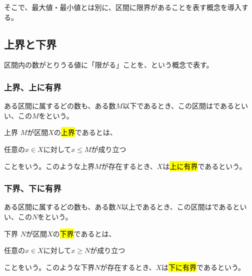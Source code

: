 \documentclass[../imaging-math]{subfiles}
\begin{document}
そこで、最大値・最小値とは別に、区間に限界があることを表す概念を導入する。

\subsection{上界と下界}

区間内の数がとりうる値に「限がる」ことを、という概念で表す。

\subsubsection{上界、上に有界}

ある区間に属するどの数も、ある数$M$以下であるとき、この区間はであるといい、この$M$をという。

\begin{definition}{上界}
  $M$が区間$X$の\hl{上界}であるとは、
  \begin{center}
    任意の$x \in X$に対して$x \leq M$が成り立つ
  \end{center}
  ことをいう。このような上界$M$が存在するとき、$X$は\hl{上に有界}であるという。
\end{definition}

\begin{center}
\end{center}

\subsubsection{下界、下に有界}

ある区間に属するどの数も、ある数$N$以上であるとき、この区間はであるといい、この$N$をという。

\begin{definition}{下界}
  $N$が区間$X$の\hl{下界}であるとは、
  \begin{center}
    任意の$x \in X$に対して$x \geq N$が成り立つ
  \end{center}
  ことをいう。このような下界$N$が存在するとき、$X$は\hl{下に有界}であるという。
\end{definition}
\end{document}

